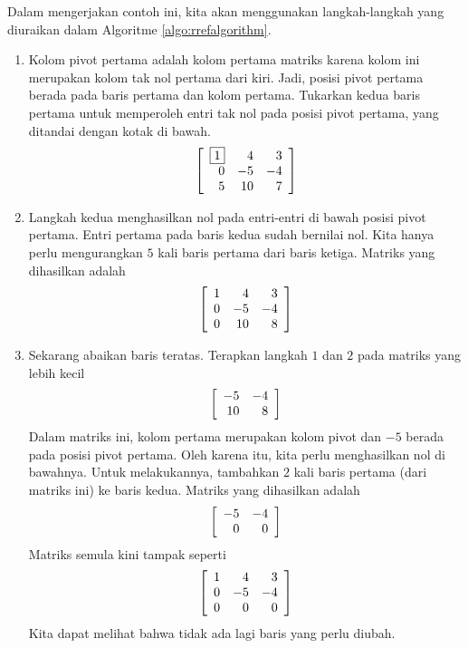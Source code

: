\begin{solution} Dalam mengerjakan contoh ini, kita akan menggunakan langkah-langkah yang diuraikan dalam Algoritme \ref{algo:rrefalgorithm}.
\begin{enumerate}

\item Kolom pivot pertama adalah kolom pertama matriks karena kolom ini merupakan kolom tak nol pertama dari kiri.
Jadi, posisi pivot pertama berada pada baris pertama dan kolom pertama. Tukarkan kedua baris pertama untuk
memperoleh entri tak nol pada posisi pivot pertama, yang ditandai dengan kotak di bawah.
\begin{equation*}
\left[
\begin{array}{rrr}
\fbox{1} & 4 & 3 \\
0 & -5 & -4 \\
5 & 10 & 7 
\end{array}
\right]
\end{equation*}

\item Langkah kedua menghasilkan nol pada entri-entri di bawah posisi pivot pertama. Entri pertama pada baris kedua
sudah bernilai nol. Kita hanya perlu mengurangkan $5$ kali baris pertama dari baris ketiga.
Matriks yang dihasilkan adalah
\begin{equation*}
\left[
\begin{array}{rrr}
1 & 4 & 3 \\
0 & -5 & -4 \\
0 & 10 & 8 
\end{array}
\right]
\end{equation*} 


\item Sekarang abaikan baris teratas. Terapkan langkah $1$ dan $2$ pada matriks yang lebih kecil
\begin{equation*}
\left[
\begin{array}{rr}
-5 & -4\\
10 & 8 
\end{array}
\right]
\end{equation*}
Dalam matriks ini, kolom pertama merupakan kolom pivot dan $-5$ berada pada posisi pivot pertama. Oleh karena itu, kita perlu menghasilkan nol di bawahnya.
Untuk melakukannya, tambahkan $2$ kali baris pertama (dari matriks ini) ke baris kedua. Matriks yang dihasilkan adalah
\begin{equation*}
\left[
\begin{array}{rr}
-5 & -4\\
0 & 0
\end{array}
\right]
\end{equation*}
Matriks semula kini tampak seperti
\begin{equation*}
\left[
\begin{array}{rrr}
1 & 4 & 3 \\
0 & -5 & -4 \\
0 & 0 & 0 
\end{array}
\right]
\end{equation*}
Kita dapat melihat bahwa tidak ada lagi baris yang perlu diubah.


\end{enumerate}
\end{solution}
